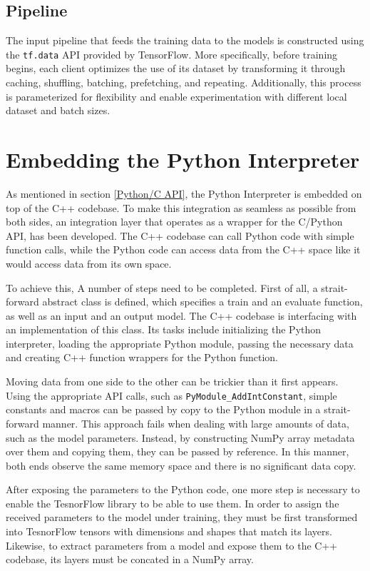 \subsection{Pipeline}
The input pipeline that feeds the training data to the models is constructed using the \texttt{tf.data} API provided by TensorFlow. More specifically, before training begins, each client optimizes the use of its dataset by transforming it through caching, shuffling, batching, prefetching, and repeating. Additionally, this process is parameterized for flexibility and enable experimentation with different local dataset and batch sizes.

\section{Embedding the Python Interpreter}
As mentioned in section \ref{Python/C API}, the Python Interpreter is embedded on top of the C++ codebase. To make this integration as seamless as possible from both sides, an integration layer that operates as a wrapper for the C/Python API, has been developed. The C++ codebase can call Python code with simple function calls, while the Python code can access data from the C++ space like it would access data from its own space.

To achieve this, A number of steps need to be completed. First of all, a strait-forward abstract class is defined, which specifies a train and an evaluate function, as well as an input and an output model. The C++ codebase is interfacing with an implementation of this class. Its tasks include initializing the Python interpreter, loading the appropriate Python module, passing the necessary data and creating C++ function wrappers for the Python function.

Moving data from one side to the other can be trickier than it first appears. Using the appropriate API calls, such as \texttt{PyModule\_AddIntConstant}, simple constants and macros can be passed by copy to the Python module in a strait-forward manner. This approach fails when dealing with large amounts of data, such as the model parameters. Instead, by constructing NumPy array metadata over them and copying them, they can be passed by reference. In this manner, both ends observe the same memory space and there is no significant data copy.

After exposing the parameters to the Python code, one more step is necessary to enable the TesnorFlow library to be able to use them. In order to assign the received parameters to the model under training, they must be first transformed into TesnorFlow tensors with dimensions and shapes that match its layers. Likewise, to extract parameters from a model and expose them to the C++ codebase, its layers must be concated in a NumPy array.


